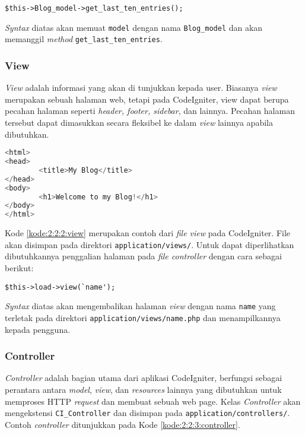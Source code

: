 \begin{center}
	\verb|$this->Blog_model->get_last_ten_entries();|
\end{center}

\textit{Syntax} diatas akan memuat \verb|model| dengan nama \verb|Blog_model| dan akan memanggil \textit{method} \verb|get_last_ten_entries|.

\subsubsection{View}
\label{sub:2:2:2:View}

\textit{View} adalah informasi yang akan di tunjukkan kepada user. Biasanya \textit{view} merupakan sebuah halaman web, tetapi pada CodeIgniter, view dapat berupa pecahan halaman seperti \textit{header, footer, sidebar}, dan lainnya. Pecahan halaman tersebut dapat dimasukkan secara fleksibel ke dalam \textit{view} lainnya apabila dibutuhkan.

\begin{lstlisting}[language=php, caption={Contoh \textit{view}}, label={kode:2:2:2:view}]
<html>
<head>
        <title>My Blog</title>
</head>
<body>
        <h1>Welcome to my Blog!</h1>
</body>
</html>
\end{lstlisting}

Kode \ref{kode:2:2:2:view} merupakan contoh dari \textit{file view} pada CodeIgniter. File akan disimpan pada direktori \verb|application/views/|. Untuk dapat diperlihatkan dibutuhkannya penggalian halaman pada \textit{file controller} dengan cara sebagai berikut:

\begin{center}
	\verb|$this->load->view(`name');|
\end{center}

\textit{Syntax} diatas akan mengembalikan halaman \textit{view} dengan nama \verb|name| yang terletak pada direktori \verb|application/views/name.php| dan menampilkannya kepada pengguna.

\subsubsection{Controller}
\label{sub:2:2:3:Controller}

\textit{Controller} adalah bagian utama dari aplikasi CodeIgniter, berfungsi sebagai perantara antara \textit{model}, \textit{view}, dan \textit{resources} lainnya yang dibutuhkan untuk memproses HTTP \textit{request} dan membuat sebuah web page. Kelas \textit{Controller} akan mengekstensi \verb|CI_Controller| dan disimpan pada \verb|application/controllers/|. Contoh \textit{controller} ditunjukkan pada Kode \ref{kode:2:2:3:controller}.

